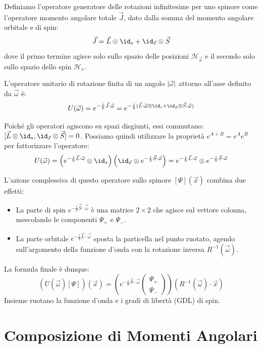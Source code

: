 Definiamo l'operatore generatore delle rotazioni infinitesime per uno spinore come l'operatore momento angolare totale \( \vec{J} \), dato dalla somma del momento angolare orbitale e di spin:
\[
    \vec{J} = \vec{L} \otimes \id_s + \id_{\vec{x}} \otimes \vec{S}
\]
dove il primo termine agisce solo sullo spazio delle posizioni \( \mathcal{H}_{\vec{x}} \) e il secondo solo sullo spazio dello spin \( \mathcal{H}_s \).

L'operatore unitario di rotazione finita di un angolo \( \abs{\vec{\omega}} \) attorno all'asse definito da \( \vec{\omega} \) è:
\[
    U(\vec{\omega}) = e^{-\frac{i}{\hbar} \vec{J} \cdot \vec{\omega}} = e^{-\frac{i}{\hbar} (\vec{L} \cdot \vec{\omega} \otimes \id_s + \id_{\vec{x}} \otimes \vec{S} \cdot \vec{\omega})}
\]

Poiché gli operatori agiscono su spazi disgiunti, essi commutano: \( [\vec{L} \otimes \id_s, \id_{\vec{x}} \otimes \vec{S}] = 0 \). Possiamo quindi utilizzare la proprietà \( e^{A+B} = e^A e^B \) per fattorizzare l'operatore:
\[
    U(\vec{\omega}) = \left( e^{-\frac{i}{\hbar} \vec{L} \cdot \vec{\omega}} \otimes \id_s \right) \left( \id_{\vec{x}} \otimes e^{-\frac{i}{\hbar} \vec{S} \cdot \vec{\omega}} \right)
    = e^{-\frac{i}{\hbar} \vec{L} \cdot \vec{\omega}} \otimes e^{-\frac{i}{\hbar} \vec{S} \cdot \vec{\omega}}
\]

L'azione complessiva di questo operatore sullo spinore \( [\Psi](\vec{x}) \) combina due effetti:
\begin{itemize}
    \item La parte di spin \( e^{-\frac{i}{\hbar} \vec{S} \cdot \vec{\omega}} \) è una matrice \( 2\times 2 \) che agisce sul vettore colonna, mescolando le componenti \( \Psi_+ \) e \( \Psi_- \).
    \item La parte orbitale \( e^{-\frac{i}{\hbar} \vec{L} \cdot \vec{\omega}} \) sposta la particella nel punto ruotato, agendo sull'argomento della funzione d'onda con la rotazione inversa \( R^{-1}(\vec{\omega}) \).
\end{itemize}

La formula finale è dunque:
\[
    (U(\vec{\omega})[\Psi])(\vec{x}) = \left( e^{-\frac{i}{\hbar} \vec{S} \cdot \vec{\omega}} \begin{pmatrix} \Psi_+ \\ \Psi_- \end{pmatrix} \right) (R^{-1}(\vec{\omega}) \cdot \vec{x})
\]
Insieme ruotano la funzione d'onda e i gradi di libertà (GDL) di spin.

\section{Composizione di Momenti Angolari}

